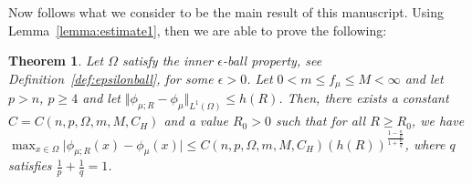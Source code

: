 \documentclass{amsart}
\newtheorem{theorem}{Theorem}
\theoremstyle{lemma}
\newtheorem{definition}[theorem]{Definition}
\theoremstyle{remark}
\begin{document}
Now follows what we consider to be the main result of this manuscript. Using Lemma~\ref{lemma:estimate1}, then we are able to prove the following:
\begin{theorem}\label{thm:explicitrates1}
Let $\Omega$ satisfy the inner $\epsilon$-ball property, see Definition~\ref{def:epsilonball}, for some $\epsilon>0$. Let $0<m \leq f_{\mu} \leq M < \infty$ and let $p>n$, $p \geq 4$ and let $\Vert \phi_{\mu;R} - \phi_{\mu} \Vert_{L^1(\Omega)} \leq h(R)$. Then, there exists a constant $C = C(n, p, \Omega, m, M, C_{H})$ and a value $R_0 >0$ such that for all $R \geq R_0$, we have $\max_{x \in \Omega} \vert \phi_{\mu;R}(x) - \phi_{\mu}(x) \vert \leq C(n, p, \Omega, m, M, C_{H}) (h(R))^{\frac{1 - \frac{n}{p}}{1+\frac{n}{q}}}$, where $q$ satisfies $\frac{1}{p}+\frac{1}{q} = 1$.
\end{theorem}
\end{document}
